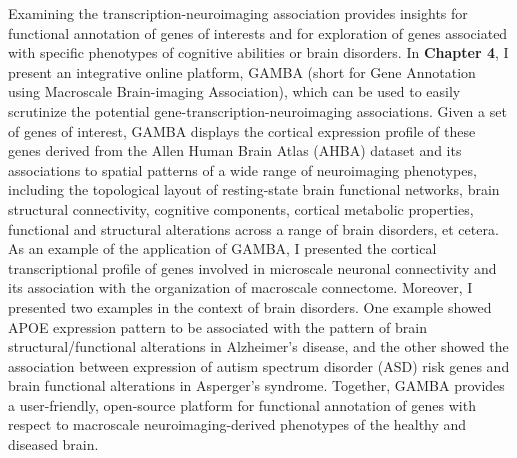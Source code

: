 \begin{refsection}
Examining the transcription-neuroimaging association provides insights for functional annotation of genes of interests and for exploration of genes associated with specific phenotypes of cognitive abilities or brain disorders. In \textbf{Chapter 4}, I present an integrative online platform, GAMBA (short for Gene Annotation using Macroscale Brain-imaging Association), which can be used to easily scrutinize the potential gene-transcription-neuroimaging associations. Given a set of genes of interest, GAMBA displays the cortical expression profile of these genes derived from the Allen Human Brain Atlas (AHBA) dataset \citep{Hawrylycz2012AnAC} and its associations to spatial patterns of a wide range of neuroimaging phenotypes, including the topological layout of resting-state brain functional networks, brain structural connectivity, cognitive components, cortical metabolic properties, functional and structural alterations across a range of brain disorders, et cetera. As an example of the application of GAMBA, I presented the cortical transcriptional profile of genes involved in microscale neuronal connectivity and its association with the organization of macroscale connectome. Moreover, I presented two examples in the context of brain disorders. One example showed APOE expression pattern to be associated with the pattern of brain structural/functional alterations in Alzheimer’s disease, and the other showed the association between expression of autism spectrum disorder (ASD) risk genes and brain functional alterations in Asperger’s syndrome. Together, GAMBA provides a user-friendly, open-source platform for functional annotation of genes with respect to macroscale neuroimaging-derived phenotypes of the healthy and diseased brain.


\end{refsection}
